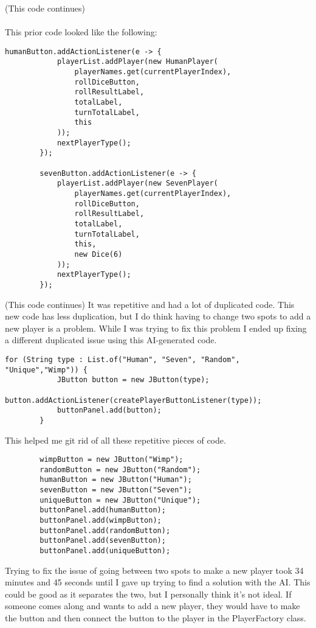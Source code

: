 \documentclass[a4paper,11pt]{article}
\begin{document}
(This code continues)\\\\
This prior code looked like the following: 
\begin{lstlisting} 
humanButton.addActionListener(e -> {
            playerList.addPlayer(new HumanPlayer(
                playerNames.get(currentPlayerIndex), 
                rollDiceButton, 
                rollResultLabel,
                totalLabel,
                turnTotalLabel,
                this
            ));
            nextPlayerType();
        });

        sevenButton.addActionListener(e -> {
            playerList.addPlayer(new SevenPlayer(
                playerNames.get(currentPlayerIndex), 
                rollDiceButton, 
                rollResultLabel,
                totalLabel,
                turnTotalLabel,
                this,
                new Dice(6)
            ));
            nextPlayerType();
        });

\end{lstlisting}
(This code continues)
It was repetitive and had a lot of duplicated code. This new code has less duplication, but I do think having to change two spots to add a new player is a problem. While I was trying to fix this problem I ended up fixing a different duplicated issue using this AI-generated code.
\begin{lstlisting} 
for (String type : List.of("Human", "Seven", "Random", "Unique","Wimp")) {
            JButton button = new JButton(type);
            button.addActionListener(createPlayerButtonListener(type));
            buttonPanel.add(button);  
        }
\end{lstlisting}
This helped me git rid of all these repetitive pieces of code.
\begin{lstlisting} 
        wimpButton = new JButton("Wimp");
        randomButton = new JButton("Random");
        humanButton = new JButton("Human");
        sevenButton = new JButton("Seven");
        uniqueButton = new JButton("Unique");
        buttonPanel.add(humanButton);
        buttonPanel.add(wimpButton);
        buttonPanel.add(randomButton);
        buttonPanel.add(sevenButton);
        buttonPanel.add(uniqueButton);

\end{lstlisting}
Trying to fix the issue of going between two spots to make a new player took 34 minutes and 45 seconds until I gave up trying to find a solution with the AI. This could be good as it separates the two, but I personally think it's not ideal. If someone comes along and wants to add a new player, they would have to make the button and then connect the button to the player in the PlayerFactory class.
\end{document}
